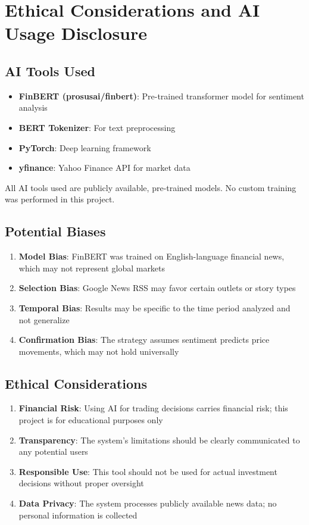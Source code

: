 \documentclass[12pt]{article}
\begin{document}
\section{Ethical Considerations and AI Usage Disclosure}

\subsection{AI Tools Used}

\begin{itemize}
\item \textbf{FinBERT (prosusai/finbert)}: Pre-trained transformer model for sentiment analysis
\item \textbf{BERT Tokenizer}: For text preprocessing
\item \textbf{PyTorch}: Deep learning framework
\item \textbf{yfinance}: Yahoo Finance API for market data
\end{itemize}

All AI tools used are publicly available, pre-trained models. No custom training was performed in this project.

\subsection{Potential Biases}

\begin{enumerate}
\item \textbf{Model Bias}: FinBERT was trained on English-language financial news, which may not represent global markets
\item \textbf{Selection Bias}: Google News RSS may favor certain outlets or story types
\item \textbf{Temporal Bias}: Results may be specific to the time period analyzed and not generalize
\item \textbf{Confirmation Bias}: The strategy assumes sentiment predicts price movements, which may not hold universally
\end{enumerate}

\subsection{Ethical Considerations}

\begin{enumerate}
\item \textbf{Financial Risk}: Using AI for trading decisions carries financial risk; this project is for educational purposes only
\item \textbf{Transparency}: The system's limitations should be clearly communicated to any potential users
\item \textbf{Responsible Use}: This tool should not be used for actual investment decisions without proper oversight
\item \textbf{Data Privacy}: The system processes publicly available news data; no personal information is collected
\end{enumerate}
\end{document}

